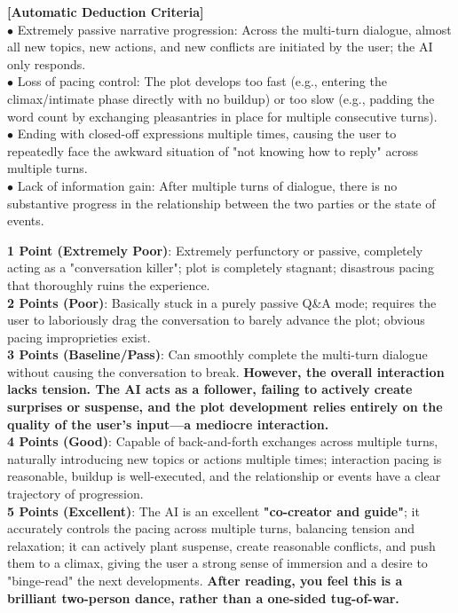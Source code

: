 \begin{tcolorbox}[
    breakable,
    colback=MyWordColor1,
    colframe=black,
    boxrule=0.6pt,
    arc=1.5mm,
    title={\textbf{DynSess-Eval Prompt: Interactive Ability}},
    fontupper=\small
]
\textbf{[Automatic Deduction Criteria]}\\
$\bullet$ Extremely passive narrative progression: Across the multi-turn dialogue, almost all new topics, new actions, and new conflicts are initiated by the user; the AI only responds.\\
$\bullet$ Loss of pacing control: The plot develops too fast (e.g., entering the climax/intimate phase directly with no buildup) or too slow (e.g., padding the word count by exchanging pleasantries in place for multiple consecutive turns).\\
$\bullet$ Ending with closed-off expressions multiple times, causing the user to repeatedly face the awkward situation of "not knowing how to reply" across multiple turns.\\
$\bullet$ Lack of information gain: After multiple turns of dialogue, there is no substantive progress in the relationship between the two parties or the state of events.

\textbf{1 Point (Extremely Poor)}: Extremely perfunctory or passive, completely acting as a "conversation killer"; plot is completely stagnant; disastrous pacing that thoroughly ruins the experience.\\
\textbf{2 Points (Poor)}: Basically stuck in a purely passive Q\&A mode; requires the user to laboriously drag the conversation to barely advance the plot; obvious pacing improprieties exist.\\
\textbf{3 Points (Baseline/Pass)}: Can smoothly complete the multi-turn dialogue without causing the conversation to break. \textbf{However, the overall interaction lacks tension. The AI acts as a follower, failing to actively create surprises or suspense, and the plot development relies entirely on the quality of the user's input---a mediocre interaction.}\\
\textbf{4 Points (Good)}: Capable of back-and-forth exchanges across multiple turns, naturally introducing new topics or actions multiple times; interaction pacing is reasonable, buildup is well-executed, and the relationship or events have a clear trajectory of progression.\\
\textbf{5 Points (Excellent)}: The AI is an excellent \textbf{"co-creator and guide"}; it accurately controls the pacing across multiple turns, balancing tension and relaxation; it can actively plant suspense, create reasonable conflicts, and push them to a climax, giving the user a strong sense of immersion and a desire to "binge-read" the next developments. \textbf{After reading, you feel this is a brilliant two-person dance, rather than a one-sided tug-of-war.}


\end{tcolorbox}
